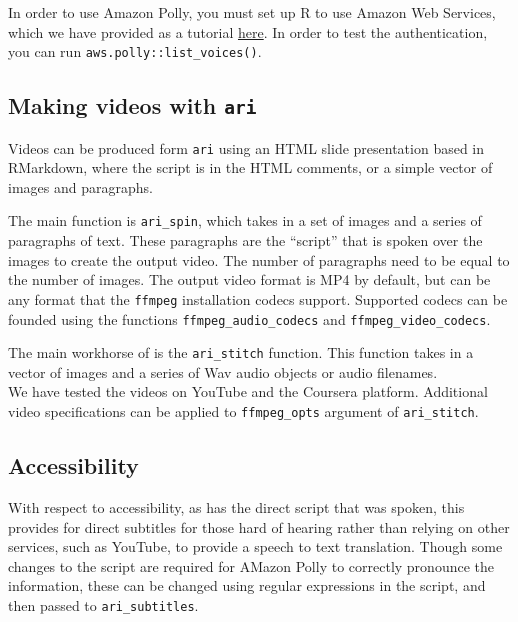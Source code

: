 In order to use Amazon Polly, you must set up R to use Amazon Web
Services, which we have provided as a tutorial
\href{http://seankross.com/2017/05/02/Access-Amazon-Web-Services-in-R.html}{here}.
In order to test the authentication, you can run
\texttt{aws.polly::list\_voices()}.

\hypertarget{making-videos-with-ari}{%
\subsection{\texorpdfstring{Making videos with
\texttt{ari}}{Making videos with ari}}\label{making-videos-with-ari}}

Videos can be produced form \texttt{ari} using an HTML slide
presentation based in RMarkdown, where the script is in the HTML
comments, or a simple vector of images and paragraphs.

The main function is \texttt{ari\_spin}, which takes in a set of images
and a series of paragraphs of text. These paragraphs are the ``script''
that is spoken over the images to create the output video. The number of
paragraphs need to be equal to the number of images. The output video
format is MP4 by default, but can be any format that the \texttt{ffmpeg}
installation codecs support. Supported codecs can be founded using the
functions \texttt{ffmpeg\_audio\_codecs} and
\texttt{ffmpeg\_video\_codecs}.

The main workhorse of  is the \texttt{ari\_stitch} function.
This function takes in a vector of images and a series of Wav audio
objects or audio filenames.\\
We have tested the videos on YouTube and the Coursera platform.
Additional video specifications can be applied to \texttt{ffmpeg\_opts}
argument of \texttt{ari\_stitch}.

\hypertarget{accessibility}{%
\subsection{Accessibility}\label{accessibility}}

With respect to accessibility, as  has the direct script that
was spoken, this provides for direct subtitles for those hard of hearing
rather than relying on other services, such as YouTube, to provide a
speech to text translation. Though some changes to the script are
required for AMazon Polly to correctly pronounce the information, these
can be changed using regular expressions in the script, and then passed
to \texttt{ari\_subtitles}.

